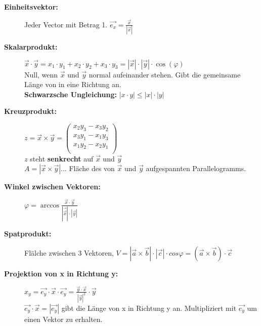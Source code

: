 \begin{description}
    \item [\textbf{Einheitsvektor:}] Jeder Vector mit Betrag 1. $\vec{e_x}=\frac{\vec{x}}{|\vec{x}|}$\\

    \item[\textbf{Skalarprodukt:}] $\vec x \cdot \vec{y} = x_1\cdot y_1 + x_2\cdot y_2 + x_3\cdot y_3 = |\vec{x}|\cdot|\vec{y}|\cdot \cos(\varphi)$\\
    Null, wenn $\vec x $ und $\vec y $ normal aufeinander stehen. Gibt die gemeinsame Länge von in eine  Richtung an.\\
    \textbf{Schwarzsche Ungleichung:} $|x\cdot y|\leq |x|\cdot |y|$\\
    
    \item[\textbf{Kreuzprodukt:}] $z = \vec x \times \vec y  = 
    \begin{pmatrix}
        x_2y_3-x_3y_2\\
        x_3y_1-x_1y_3\\
        x_1y_2-x_2y_1\\
    \end{pmatrix}$\\
    
    $z$ steht \textbf{senkrecht} auf $\vec x $ und $\vec y $\\
    $A = |\vec x \times \vec y |$... Fläche des von $\vec x $ und $\vec y $ aufgespannten Parallelogramms.\\

    \item[\textbf{Winkel zwischen Vektoren:}]  $\varphi = \arccos \frac{\vec x \cdot \vec y }{|\vec{\vec x }|\cdot |\vec y |}$\\
    
    \item[\textbf{Spatprodukt:} ] Flälche zwischen 3 Vektoren, $V = |\vec a \times \vec b |\cdot |\vec c | \cdot cos \varphi = (\vec a \times \vec b )\cdot \vec c $\\
    
    \item[\textbf{Projektion von x in Richtung y:}] $x_y=\vec{e_y}\cdot \vec{x} \cdot \vec{e_y}=\frac{\vec{y}\cdot \vec{x}}{|\vec{y}|^2} \cdot \vec{y}$\\
    $\vec{e_y}\cdot \vec{x} = |\vec{e_y}|$ gibt die Länge von x in Richtung y an. Multipliziert mit $\vec{e_y}$ um einen Vektor zu erhalten.
    

\end{description}
 